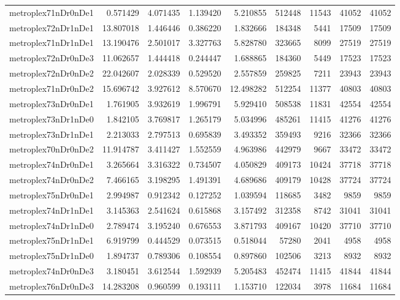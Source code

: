 \begin{longtable}{|l|r|r|r|r|r|r|r|r|}
metroplex71nDr0nDe1 & 0.571429 & 4.071435 & 1.139420 & 5.210855 & 512448 & 11543 & 41052 & 41052 \\
metroplex72nDr1nDe1 & 13.807018 & 1.446446 & 0.386220 & 1.832666 & 184348 & 5441 & 17509 & 17509 \\
metroplex71nDr1nDe1 & 13.190476 & 2.501017 & 3.327763 & 5.828780 & 323665 & 8099 & 27519 & 27519 \\
metroplex72nDr0nDe3 & 11.062657 & 1.444418 & 0.244447 & 1.688865 & 184360 & 5449 & 17523 & 17523 \\
metroplex72nDr0nDe2 & 22.042607 & 2.028339 & 0.529520 & 2.557859 & 259825 & 7211 & 23943 & 23943 \\
metroplex71nDr0nDe2 & 15.696742 & 3.927612 & 8.570670 & 12.498282 & 512254 & 11377 & 40803 & 40803 \\
metroplex73nDr0nDe1 & 1.761905 & 3.932619 & 1.996791 & 5.929410 & 508538 & 11831 & 42554 & 42554 \\
metroplex73nDr1nDe0 & 1.842105 & 3.769817 & 1.265179 & 5.034996 & 485261 & 11415 & 41276 & 41276 \\
metroplex73nDr1nDe1 & 2.213033 & 2.797513 & 0.695839 & 3.493352 & 359493 & 9216 & 32366 & 32366 \\
metroplex70nDr0nDe2 & 11.914787 & 3.411427 & 1.552559 & 4.963986 & 442979 & 9667 & 33472 & 33472 \\
metroplex74nDr0nDe1 & 3.265664 & 3.316322 & 0.734507 & 4.050829 & 409173 & 10424 & 37718 & 37718 \\
metroplex74nDr0nDe2 & 7.466165 & 3.198295 & 1.491391 & 4.689686 & 409179 & 10428 & 37724 & 37724 \\
metroplex75nDr0nDe1 & 2.994987 & 0.912342 & 0.127252 & 1.039594 & 118685 & 3482 & 9859 & 9859 \\
metroplex74nDr1nDe1 & 3.145363 & 2.541624 & 0.615868 & 3.157492 & 312358 & 8742 & 31041 & 31041 \\
metroplex74nDr1nDe0 & 2.789474 & 3.195240 & 0.676553 & 3.871793 & 409167 & 10420 & 37710 & 37710 \\
metroplex75nDr1nDe1 & 6.919799 & 0.444529 & 0.073515 & 0.518044 & 57280 & 2041 & 4958 & 4958 \\
metroplex75nDr1nDe0 & 1.894737 & 0.789306 & 0.108554 & 0.897860 & 102506 & 3213 & 8932 & 8932 \\
metroplex74nDr0nDe3 & 3.180451 & 3.612544 & 1.592939 & 5.205483 & 452474 & 11415 & 41844 & 41844 \\
metroplex76nDr0nDe3 & 14.283208 & 0.960599 & 0.193111 & 1.153710 & 122034 & 3978 & 11684 & 11684 \\

\end{longtable}
